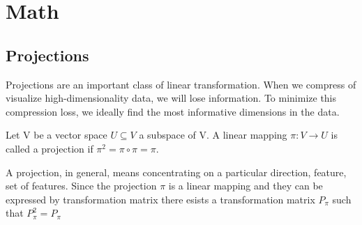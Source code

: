 \section{Math}
\subsection{Projections}
Projections are an important class of linear transformation. When we compress of visualize high-dimensionality data, we will lose information. To minimize this compression loss, we ideally find the most informative dimensions in the data.
\begin{definition}[Projection]
    Let V be a vector space $U \subseteq V$ a subspace of V. A linear mapping $\pi: V \longrightarrow U$ is called a projection if $\pi^2 = \pi \circ \pi = \pi$.
\end{definition}
A projection, in general, means concentrating on a particular direction, feature, set of features. Since the projection $\pi$ is a linear mapping and they can be expressed by transformation matrix there esists a transformation matrix $P_\pi$ such that $ P_\pi^2 = P_\pi $
